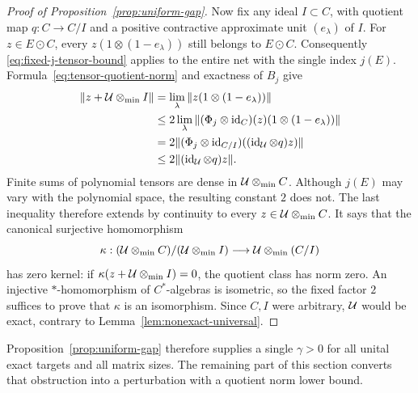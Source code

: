 \begin{proof}[Proof of Proposition~\ref{prop:uniform-gap}]
Now fix any ideal $I\subset C$, with quotient map $q:C\to C/I$
and a positive contractive approximate unit $(e_\lambda)$ of $I$.
For $z\in E\odot C$, every
$z(1\otimes(1-e_\lambda))$ still belongs to $E\odot C$.
Consequently \eqref{eq:fixed-j-tensor-bound} applies to the entire
net with the single index $j(E)$.  Formula~\eqref{eq:tensor-quotient-norm}
and exactness of $B_j$ give
\begin{align*}
 \|z+\mathcal U\otimes_{\min}I\|
 &=\lim_\lambda\|z(1\otimes(1-e_\lambda))\|\\
 &\leq2\lim_\lambda
   \|(\Phi_j\otimes\operatorname{id}_C)(z)(1\otimes(1-e_\lambda))\|\\
 &=2\|(\Phi_j\otimes\operatorname{id}_{C/I})((\operatorname{id}_\mathcal U\otimes q)z)\|\\
 &\leq2\|(\operatorname{id}_\mathcal U\otimes q)z\|.
\end{align*}
Finite sums of polynomial tensors are dense in $\mathcal U\otimes_{\min}C$.
Although $j(E)$ may vary with the polynomial space, the resulting
constant $2$ does not.  The last inequality therefore extends by
continuity to every $z\in\mathcal U\otimes_{\min}C$.  It says that the
canonical surjective homomorphism
\[
 \kappa:(\mathcal U\otimes_{\min}C)/(\mathcal U\otimes_{\min}I)
 \longrightarrow\mathcal U\otimes_{\min}(C/I)
\]
has zero kernel: if $\kappa(z+\mathcal U\otimes_{\min}I)=0$, the quotient
class has norm zero.  An injective $*$-homomorphism of $C^*$-algebras
is isometric, so the fixed factor $2$ suffices to prove that $\kappa$
is an isomorphism.  Since $C,I$ were arbitrary, $\mathcal U$ would be exact,
contrary to Lemma~\ref{lem:nonexact-universal}.
\end{proof}

Proposition~\ref{prop:uniform-gap} therefore supplies a single
$\gamma>0$ for all unital exact targets and all matrix sizes.  The remaining
part of this section converts that obstruction into a perturbation
with a quotient norm lower bound.
